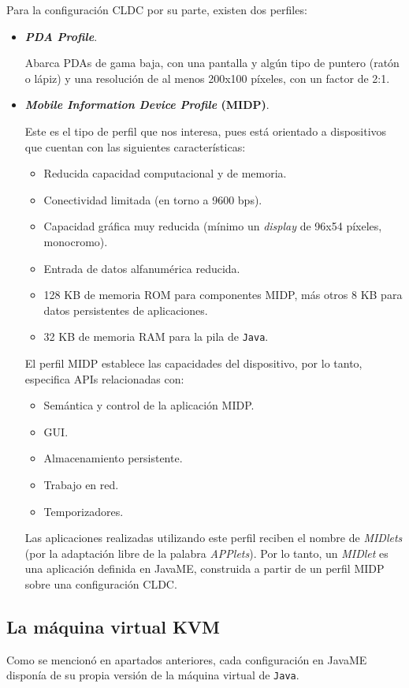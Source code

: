 Para la configuración \acs{CLDC} por su parte, existen dos perfiles:
\begin{itemize}
\item \textbf{\emph{PDA Profile}}.

Abarca \acs{PDA}s de gama baja, con una pantalla y algún tipo de puntero
(ratón o lápiz) y una resolución de al menos 200x100 píxeles, con un factor
de 2:1.

\item \textbf{\emph{Mobile Information Device Profile} (\acs{MIDP})}.

Este es el tipo de perfil que nos interesa, pues está orientado a dispositivos 
que cuentan con las siguientes características:
\begin{itemize}
\item Reducida capacidad computacional y de memoria.
\item Conectividad limitada (en torno a 9600 bps).
\item Capacidad gráfica muy reducida (mínimo un \emph{display} de 96x54
píxeles, monocromo).
\item Entrada de datos alfanumérica reducida.
\item 128 KB de memoria \acs{ROM} para componentes \acs{MIDP}, más otros
8 KB para datos persistentes de aplicaciones.
\item 32 KB de memoria \acs{RAM} para la pila de \texttt{Java}.
\end{itemize}

El perfil \acs{MIDP} establece las capacidades del dispositivo, por lo tanto,
especifica \acs{API}s relacionadas con:
\begin{itemize}
\item Semántica y control de la aplicación \acs{MIDP}.
\item \acs{GUI}.
\item Almacenamiento persistente.
\item Trabajo en red.
\item Temporizadores.
\end{itemize}

Las aplicaciones realizadas utilizando este perfil reciben el nombre de
\emph{MIDlets} (por la adaptación libre de la palabra \emph{APPlets}). Por
lo tanto, un \emph{MIDlet} es una aplicación definida en \acs{JavaME},
construida a partir de un perfil \acs{MIDP} sobre una configuración
\acs{CLDC}.
\end{itemize}

\subsection{La máquina virtual \acs{KVM}}
Como se mencionó en apartados anteriores, cada configuración en \acs{JavaME}
disponía de su propia versión de la máquina virtual de \texttt{Java}.

